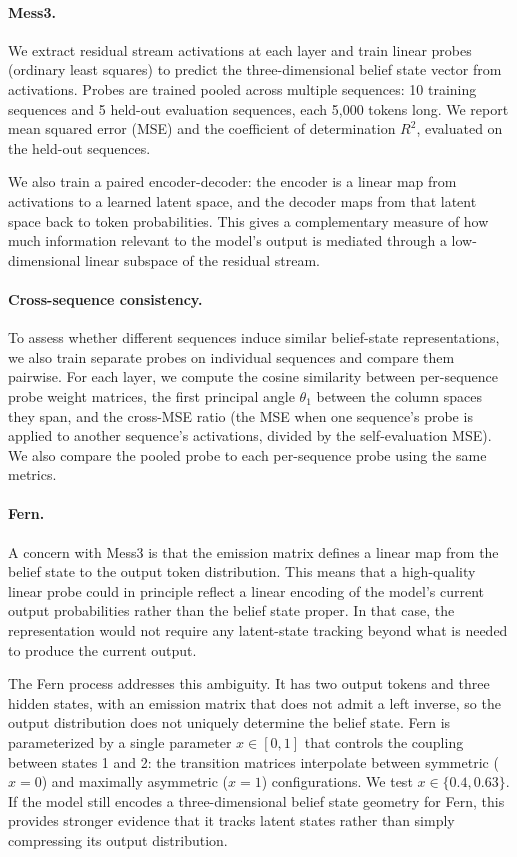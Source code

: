 \documentclass[midterm]{sparreport}
\begin{document}
\paragraph{Mess3.}
We extract residual stream activations at each layer and train linear probes (ordinary least squares) to predict the three-dimensional belief state vector from activations. Probes are trained pooled across multiple sequences: 10 training sequences and 5 held-out evaluation sequences, each 5,000 tokens long. We report mean squared error (MSE) and the coefficient of determination $R^2$, evaluated on the held-out sequences.

We also train a paired encoder-decoder: the encoder is a linear map from activations to a learned latent space, and the decoder maps from that latent space back to token probabilities. This gives a complementary measure of how much information relevant to the model's output is mediated through a low-dimensional linear subspace of the residual stream.

\paragraph{Cross-sequence consistency.}
To assess whether different sequences induce similar belief-state representations, we also train separate probes on individual sequences and compare them pairwise. For each layer, we compute the cosine similarity between per-sequence probe weight matrices, the first principal angle $\theta_1$ between the column spaces they span, and the cross-MSE ratio (the MSE when one sequence's probe is applied to another sequence's activations, divided by the self-evaluation MSE). We also compare the pooled probe to each per-sequence probe using the same metrics.

\paragraph{Fern.}
A concern with Mess3 is that the emission matrix defines a linear map from the belief state to the output token distribution. This means that a high-quality linear probe could in principle reflect a linear encoding of the model's current output probabilities rather than the belief state proper. In that case, the representation would not require any latent-state tracking beyond what is needed to produce the current output.

The Fern process addresses this ambiguity. It has two output tokens and three hidden states, with an emission matrix that does not admit a left inverse, so the output distribution does not uniquely determine the belief state. Fern is parameterized by a single parameter $x \in [0, 1]$ that controls the coupling between states 1 and 2: the transition matrices interpolate between symmetric ($x = 0$) and maximally asymmetric ($x = 1$) configurations. We test $x \in \{0.4, 0.63\}$. If the model still encodes a three-dimensional belief state geometry for Fern, this provides stronger evidence that it tracks latent states rather than simply compressing its output distribution.
\end{document}
